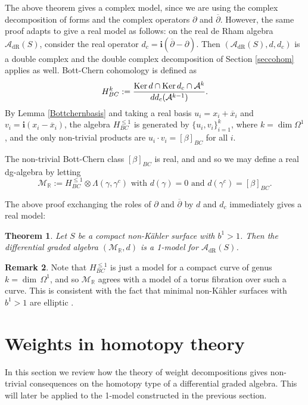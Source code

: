 \documentclass[a4paper]{amsart}
\newtheorem{theo}{Theorem}[section]
\theoremstyle{definition}
\newtheorem{rema}[theo]{Remark}
\newcommand{\RR}{\mathbb{R}}
\newcommand{\Aa}{\mathcal{A}}
\newcommand{\Mm}{\mathcal{M}}
\newcommand{\Ker}{\mathrm{Ker}\,}
\newcommand{\ov}{\overline}
\newcommand{\del}{\partial}
\newcommand{\delb}{{\overline\partial}}
\newcommand{\dR}{\mathrm{dR}}
\begin{document}
The above theorem gives a complex model, since we are using the complex decomposition of forms and the complex operators $\del$ and $\delb$.
However, the same proof adapts to give a real model as follows:
on the real de Rham algebra $\Aa_{\dR}(S)$, consider the real operator $d_c=\mathbf{i}(\delb-\del)$.
Then $(\Aa_{\dR}(S),d,d_c)$ is a double complex and the double complex decomposition of Section \ref{seccohom} applies as well. Bott-Chern cohomology is defined as
\[H_{BC}^k:={{\Ker d\cap\Ker d_c\cap\Aa^{k}}\over{dd_c(\Aa^{k-1})}}.\]
By Lemma \ref{Bottchernbasis} and taking a real basis $u_i=x_i+\ov x_i$ and $v_i=\mathbf{i}(x_i-\ov{x}_i)$,
the algebra $H^{\leq 1}_{BC}$  is generated by $\{u_i,v_i\}_{i=1}^k$, where $k=\dim \Omega^1$, and the only non-trivial products are
$u_i\cdot v_i=[\beta]_{BC}$ for all $i$.

The non-trivial Bott-Chern class $[\beta]_{BC}$ is real, and
and
so we may define a real dg-algebra by letting
\[\Mm_\RR:=H_{BC}^{\leq 1}\otimes\Lambda(\gamma,\gamma^c)\text{ with }d(\gamma)=0\text{ and }d(\gamma^c)=[\beta]_{BC}.\]

The above proof exchanging the roles of $\del$ and $\delb$ by $d$ and $d_c$ immediately gives a real model:

\begin{theo}\label{theomodelreal}Let $S$ be a compact non-Kähler surface with $b^1>1$. Then the differential graded algebra $(\Mm_\RR,d)$
is a 1-model for $\Aa_{\dR}(S)$.
\end{theo}

\begin{rema}
Note that $H_{BC}^{\leq 1}$ is just a model for a compact curve of genus $k=\dim\,\Omega^1$, and so $\Mm_\RR$ agrees with a model of a torus fibration over such a curve. This is consistent with the fact that minimal non-Kähler surfaces with $b^1>1$ are elliptic \cite{Belgun}.
\end{rema}


\section{Weights in homotopy theory}\label{secweights}
In this section we review how the theory of weight decompositions gives non-trivial consequences on the homotopy type of a differential graded algebra. This will later be applied to the 1-model constructed in the previous section.
\end{document}
